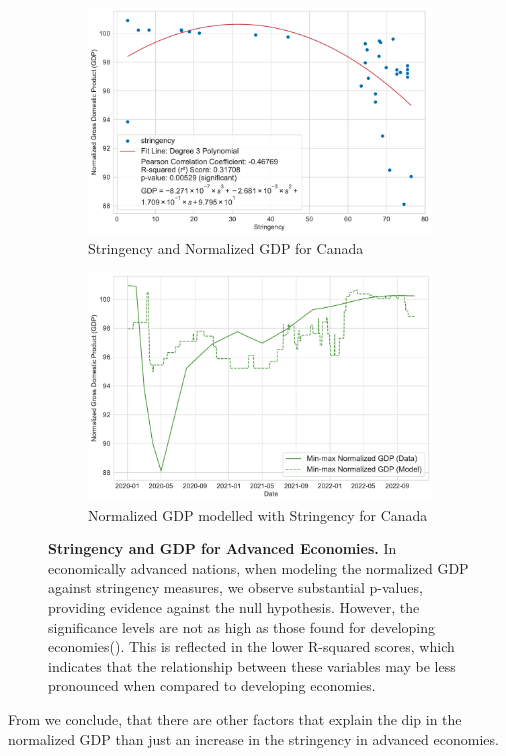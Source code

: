 \documentclass[tikz,fleqn,12pt]{wlscirep}
\begin{document}
\begin{figure}[htbp!]
  \begin{subfigure}[t]{0.48\textwidth}
    \centering
    \includegraphics[width=\linewidth]{images/stringency_vs_gdp_CAN.pdf}
    \caption{Stringency and Normalized GDP for Canada}
  \end{subfigure}
  \label{fig:stringency_vs_gdp_CAN}
  \hfill
  \begin{subfigure}[t]{0.48\textwidth}
    \centering
    \includegraphics[width=\linewidth]{images/gdp_modelled_with_stringency_CAN.pdf}
    \caption{Normalized GDP modelled with Stringency for Canada}
  \end{subfigure}
  \label{fig:gdp_modelled_with_stringency_CAN}
  \caption{\textbf{Stringency and GDP for Advanced Economies.} In economically advanced nations, when modeling the normalized GDP against stringency measures, we observe substantial p-values, providing evidence against the null hypothesis. However, the significance levels are not as high as those found for developing economies(). This is reflected in the lower R-squared scores, which indicates that the relationship between these variables may be less pronounced when compared to developing economies.}
\end{figure}
From  we conclude, that there are other factors that explain the dip in the normalized GDP than just an increase in the stringency in advanced economies.
\end{document}
